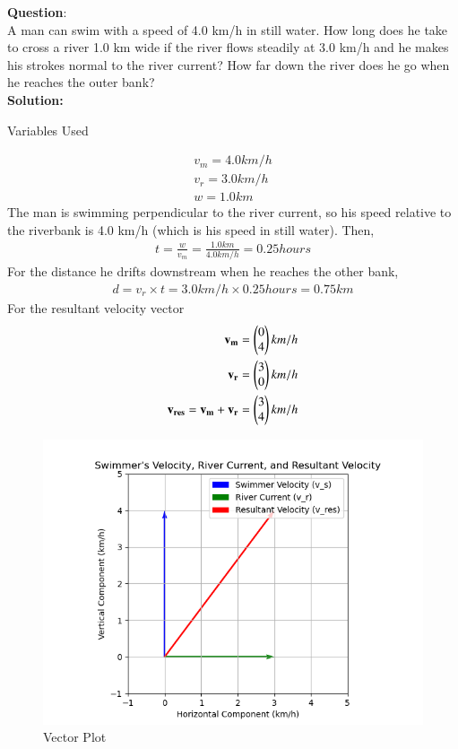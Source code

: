 \documentclass[journal]{IEEEtran}
\begin{document}
\textbf{Question}:\\
A man can swim with a speed of 4.0 km/h in still water. How long does he take to cross a river 1.0 km wide if the river flows steadily at 3.0 km/h and he makes his strokes normal to the river current? How far down the river does he go when he reaches the outer bank? \\
\textbf{Solution: }
\begin{table}[h!]    
  \centering
  
  \caption{Variables Used}
  \label{tab 1.2.26.1}
\end{table}
\begin{align}
	v_{m} = 4.0 km/h \\
	v_{r} = 3.0 km/h \\
	w = 1.0 km
\end{align}
The man is swimming perpendicular to the river current, so his speed relative to the riverbank is 4.0 km/h (which is his speed in still water). Then,
\begin{align}
	t = \frac{w}{v_{m}} = \frac{1.0 km}{4.0 km/h} = 0.25 hours
\end{align}
For the distance he drifts downstream when he reaches the other bank,
\begin{align}
	d = v_{r} \times t = 3.0 km/h \times 0.25 hours = 0.75 km
\end{align}
For the resultant velocity vector
\begin{align}
	\mathbf{v_{m}}=\begin{pmatrix}0 \\ 4\end{pmatrix} km/h \\
	\mathbf{v_{r}}=\begin{pmatrix}3 \\ 0\end{pmatrix} km/h \\
	\mathbf{v_{res}}=\mathbf{v_{m}}+\mathbf{v_{r}}=\begin{pmatrix} 3 \\ 4\end{pmatrix} km/h
\end{align}
\begin{figure}[h!]
   \centering
   \includegraphics[width=0.7\linewidth]{figures/Figure_1.png}
   \caption{Vector Plot}
   \label{vector}
\end{figure}
\end{document}
